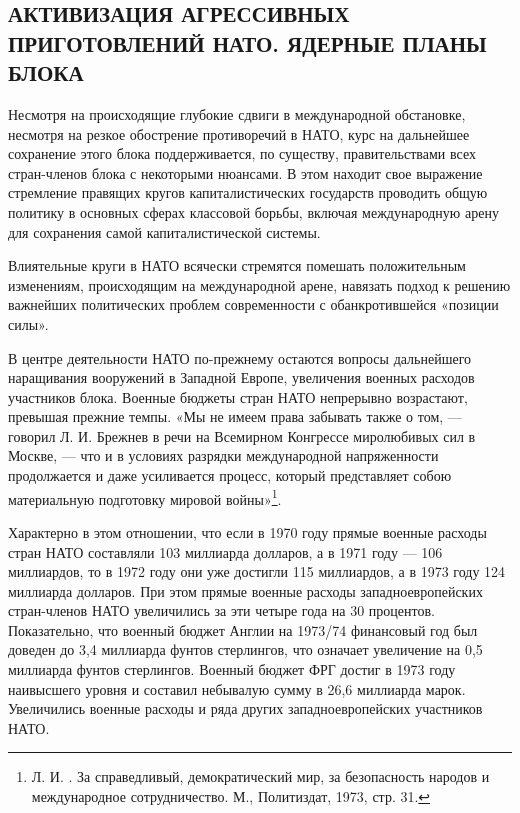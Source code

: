 \documentclass[12pt, a4paper, openany]{book}
\begin{document}
		\subsection[Активизация агрессивных приготовлений НАТО. Ядерные планы блока]{\center АКТИВИЗАЦИЯ АГРЕССИВНЫХ ПРИГОТОВЛЕНИЙ НАТО. ЯДЕРНЫЕ ПЛАНЫ БЛОКА}	
	
	
	Несмотря на происходящие глубокие сдвиги в международной обстановке, несмотря на резкое обострение противоречий в НАТО, курс на дальнейшее сохранение этого блока поддерживается, по существу, правительствами всех стран-членов блока с некоторыми нюансами. В этом находит свое выражение стремление правящих кругов капиталистических государств проводить общую политику в основных сферах классовой борьбы, включая международную арену для сохранения самой капиталистической системы.
	
	Влиятельные круги в НАТО всячески стремятся помешать положительным изменениям, происходящим на международной арене, навязать подход к решению важнейших политических проблем современности с обанкротившейся «позиции силы».
	
	В центре деятельности НАТО по-прежнему остаются вопросы дальнейшего наращивания вооружений в Западной Европе, увеличения военных расходов участников блока. Военные бюджеты стран НАТО непрерывно возрастают, превышая прежние темпы. «Мы не имеем права забывать также о том, — говорил Л. И. Брежнев в речи на Всемирном Конгрессе миролюбивых сил в Москве, — что и в условиях разрядки международной напряженности продолжается и даже усиливается процесс, который представляет собою материальную подготовку мировой войны»{\footnote{Л. И. . За справедливый, демократический мир, за безопасность народов и международное сотрудничество. М., Политиздат, 1973, стр. 31.}}.
	
	Характерно в этом отношении, что если в 1970 году прямые военные расходы стран НАТО составляли 103 миллиарда долларов, а в 1971 году — 106 миллиардов, то в 1972 году они уже достигли 115 миллиардов, а в 1973 году 124 миллиарда долларов. При этом прямые военные расходы западноевропейских стран-членов НАТО увеличились за эти четыре года на 30 процентов. Показательно, что военный бюджет Англии на 1973/74 финансовый год был доведен до 3,4 миллиарда фунтов стерлингов, что означает увеличение на 0,5 миллиарда фунтов стерлингов. Военный бюджет ФРГ достиг в 1973 году наивысшего уровня и составил небывалую сумму в 26,6 миллиарда марок. Увеличились военные расходы и ряда других западноевропейских участников НАТО.
	
\end{document}
